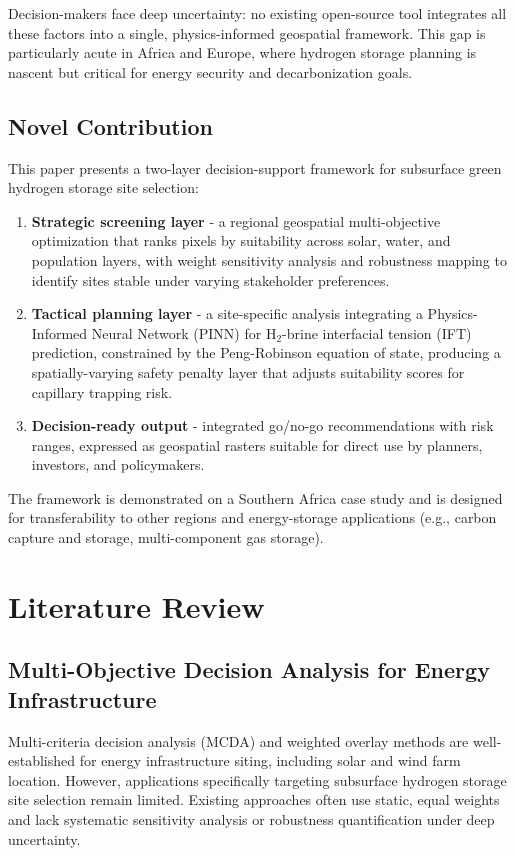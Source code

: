 \documentclass[11pt]{article}
\begin{document}
Decision-makers face deep uncertainty: no existing open-source tool integrates all these factors into a single, physics-informed geospatial framework. This gap is particularly acute in Africa and Europe, where hydrogen storage planning is nascent but critical for energy security and decarbonization goals.

\subsection{Novel Contribution}
This paper presents a two-layer decision-support framework for subsurface green hydrogen storage site selection:

\begin{enumerate}
    \item \textbf{Strategic screening layer} - a regional geospatial multi-objective optimization that ranks pixels by suitability across solar, water, and population layers, with weight sensitivity analysis and robustness mapping to identify sites stable under varying stakeholder preferences.
    \item \textbf{Tactical planning layer} - a site-specific analysis integrating a Physics-Informed Neural Network (PINN) for H$_2$-brine interfacial tension (IFT) prediction, constrained by the Peng-Robinson equation of state, producing a spatially-varying safety penalty layer that adjusts suitability scores for capillary trapping risk.
    \item \textbf{Decision-ready output} - integrated go/no-go recommendations with risk ranges, expressed as geospatial rasters suitable for direct use by planners, investors, and policymakers.
\end{enumerate}

The framework is demonstrated on a Southern Africa case study and is designed for transferability to other regions and energy-storage applications (e.g., carbon capture and storage, multi-component gas storage).

\section{Literature Review}
\subsection{Multi-Objective Decision Analysis for Energy Infrastructure}
Multi-criteria decision analysis (MCDA) and weighted overlay methods are well-established for energy infrastructure siting, including solar and wind farm location. However, applications specifically targeting subsurface hydrogen storage site selection remain limited. Existing approaches often use static, equal weights and lack systematic sensitivity analysis or robustness quantification under deep uncertainty.
\end{document}
